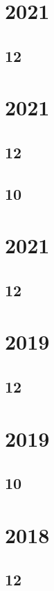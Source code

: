\documentclass[11pt]{book}
\begin{document}
\section{2021}
\subsection{12}

\section{2021}
\subsection{12}

\subsection{10}

\section{2021}
\subsection{12}

\section{2019}
\subsection{12}







\section{2019}
\subsection{10}


\section{2018}
\subsection{12}



\end{document}
